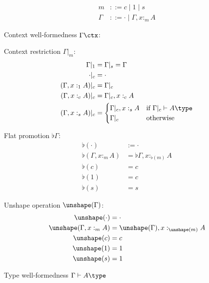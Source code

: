 \documentclass[a4paper,12pt]{article}
\begin{document}
\begin{align}
  m &::= c \mid 1 \mid s \\
  \Gamma &::= \cdot \mid \Gamma,x:_m A
\end{align}

Context well-formedness $\Gamma \ctx$:

Context restriction $\Gamma |_m$:
\begin{align*}
    \Gamma|_1 &= \Gamma|_s = \Gamma \\
    \cdot |_c &= \cdot \\
    (\Gamma,x:_1 A)|_c &= \Gamma|_c \\
    (\Gamma,x:_c A)|_c &= \Gamma|_c, x:_c A \\
    (\Gamma,x:_s A)|_c &= \begin{cases} 
                            \Gamma|_c,x:_s A &\text{if}~\Gamma|_c \vdash A \type \\
                            \Gamma|_c &\text{otherwise}
                         \end{cases}
\end{align*}

Flat promotion $\flat\Gamma$:
\begin{align*}
    \flat(\cdot) &:= \cdot \\
    \flat(\Gamma,x:_m A) &= \flat \Gamma, x:_{\flat(m)} A \\
    \flat(c) &= c \\
    \flat(1) &= c \\
    \flat(s) &= s
\end{align*}

Unshape operation $\unshape(\Gamma)$:
\begin{align*}
    \unshape(\cdot) &= \cdot \\
    \unshape(\Gamma,x:_m A) &= \unshape(\Gamma),x:_{\unshape(m)} A \\
    \unshape(c) &= c \\
    \unshape(1) &= 1 \\
    \unshape(s) &= 1
\end{align*}
{\color{red}{The resulting context is not necessarily well-formed, e.g. $x:_s A,y:_c B[x]$. This is a problem with this entire section.}}

Type well-formedness $\Gamma \vdash A \type$
\end{document}
